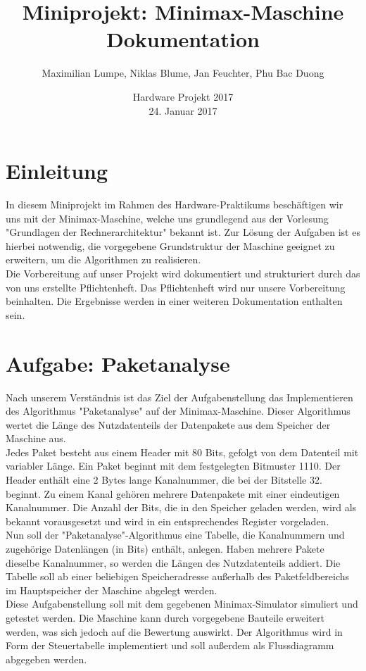 \documentclass[12pt,titlepage,german,a4]{article}
\begin{document}
    \title{\bf Miniprojekt: Minimax-Maschine \\ Dokumentation}
    \date{Hardware Projekt 2017 \\ 24. Januar 2017}
    \author{Maximilian Lumpe, Niklas Blume, Jan Feuchter, Phu Bac Duong}
    \maketitle

    \tableofcontents

    \newpage

    \section{Einleitung}
    In diesem Miniprojekt im Rahmen des Hardware-Praktikums besch{\"a}ftigen wir uns mit der Minimax-Maschine, welche uns grundlegend aus der Vorlesung "Grundlagen der Rechnerarchitektur" bekannt ist. Zur L{\"o}sung der Aufgaben ist es hierbei notwendig, die vorgegebene Grundstruktur der Maschine geeignet zu erweitern, um die Algorithmen zu realisieren.\\Die Vorbereitung auf unser Projekt wird dokumentiert und strukturiert durch das von uns erstellte Pflichtenheft. Das Pflichtenheft wird nur unsere Vorbereitung beinhalten. Die Ergebnisse werden in einer weiteren Dokumentation enthalten sein.

    \section{Aufgabe: Paketanalyse}
    Nach unserem Verst{\"a}ndnis ist das Ziel der Aufgabenstellung das Implementieren des Algorithmus "Paketanalyse" auf der Minimax-Maschine. Dieser Algorithmus wertet die L{\"a}nge des Nutzdatenteils der Datenpakete aus dem Speicher der Maschine aus.\\Jedes Paket besteht aus einem Header mit 80 Bits, gefolgt von dem Datenteil mit variabler L{\"a}nge. Ein Paket beginnt mit dem festgelegten Bitmuster 1110. Der Header enth{\"a}lt eine 2 Bytes lange Kanalnummer, die bei der Bitstelle 32. beginnt. Zu einem Kanal geh{\"o}ren mehrere Datenpakete mit einer eindeutigen Kanalnummer. Die Anzahl der Bits, die in den Speicher geladen werden, wird als bekannt vorausgesetzt und wird in ein entsprechendes Register vorgeladen.\\Nun soll der "Paketanalyse"-Algorithmus eine Tabelle, die Kanalnummern und zugeh{\"o}rige Datenl{\"a}ngen (in Bits) enth{\"a}lt, anlegen. Haben mehrere Pakete dieselbe Kanalnummer, so werden die L{\"a}ngen des Nutzdatenteils addiert. Die Tabelle soll ab einer beliebigen Speicheradresse au{\ss}erhalb des Paketfeldbereichs im Hauptspeicher der Maschine abgelegt werden.\\Diese Aufgabenstellung soll mit dem gegebenen Minimax-Simulator simuliert und getestet werden. Die Maschine kann durch vorgegebene Bauteile erweitert werden, was sich jedoch auf die Bewertung auswirkt. Der Algorithmus wird in Form der Steuertabelle implementiert und soll au{\ss}erdem als Flussdiagramm abgegeben werden.
\end{document}
